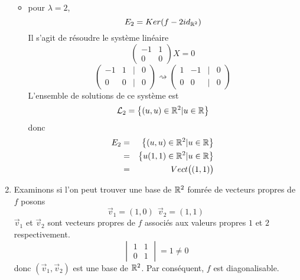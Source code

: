 \begin{enumerate}[(1)]
\begin{itemize}
      \item pour $\lambda = 2$,
        $$E_2 = Ker(f - 2 id_{\mathbb{R}^2})$$
        Il s'agit de résoudre le système linéaire
        $$\begin{pmatrix} -1 & 1 \\ 0 & 0 \end{pmatrix} X = 0$$
        $$\begin{pmatrix} -1 & 1 & \vert & 0 \\ 0 & 0 & \vert & 0 \end{pmatrix} \rightsquigarrow
          \begin{pmatrix} 1 & -1 & \vert & 0 \\ 0 & 0 & \vert & 0 \end{pmatrix}$$
        L'ensemble de solutions de ce système est
        $$\mathcal{L}_2 = \left\{(u, u) \in \mathbb{R}^2 \vert u \in \mathbb{R} \right\}$$
        donc 
        \begin{eqnarray*}
          E_2 &=& \left\{(u, u) \in \mathbb{R}^2 \vert u \in \mathbb{R} \right\} \\
            &=& \left\{u(1, 1) \in \mathbb{R}^2 \vert u \in \mathbb{R} \right\} \\
            &=& Vect\big((1, 1)\big)
        \end{eqnarray*}
    \end{itemize}
  
  \item Examinons si l'on peut trouver une base de $\mathbb{R}^2$ fomrée de vecteurs propres de $f$ posons
    $$\vec{v}_1 = (1, 0) ~ ~ \vec{v}_2 = (1, 1)$$
    $\vec{v}_1$ et $\vec{v}_2$ sont vecteurs propres de $f$ associés aux valeurs propres $1$ et $2$ respectivement.
    $$\begin{vmatrix} 1 & 1 \\ 0 & 1 \end{vmatrix} = 1 \neq 0$$
    donc $(\vec{v}_1, \vec{v}_2)$ est une base de $\mathbb{R}^2$. Par conséquent, $f$ est diagonalisable.
    

\end{enumerate}
